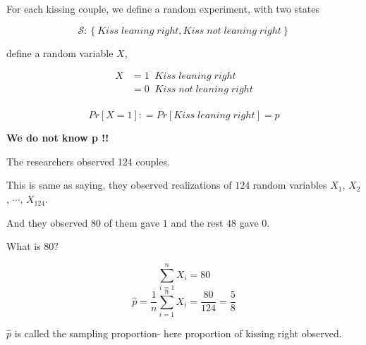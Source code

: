 \documentclass{beamer}\usepackage[]{graphicx}\usepackage[]{color}
\begin{document}
\begin{frame}[fragile]

For each kissing couple, we define a random experiment, with two states \pause

$$ \mathcal{S} : \left \{ Kiss \; leaning \; right, Kiss \; not \; leaning \; right \right \} $$  \pause \newline

define a random variable $X$,

\begin{align}
X & = 1 \;\; Kiss \; leaning  \; right \\
  & = 0 \; \; Kiss \; not \; leaning \; right  \\
\end{align} \pause

$$ Pr \left [ X=1 \right ] : = Pr \left[ Kiss \; leaning \; right \right ] = p $$ \pause

\textbf{We do not know p !!} 

\end{frame}

\begin{frame}[fragile]

The researchers observed 124 couples. \pause \newline

This is same as saying, they observed realizations of $124$ random variables 
$X_1$, $X_2$, $\cdots$, $X_{124}$. \pause \newline

And they observed $80$ of them gave $1$ and the rest $48$ gave $0$. \pause \newline

What is $80 ?$

$$ \sum_{i=1}^{n} X_{i} = 80 $$
$$ \hat{p} = \frac{1}{n} \sum_{i=1}^{n} X_{i} = \frac{80}{124} = \frac{5}{8} $$

$\hat{p}$ is called the sampling proportion- here proportion of kissing right observed.

\end{frame}
\end{document}

